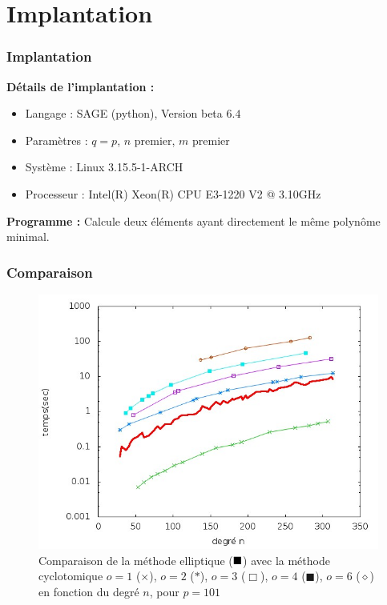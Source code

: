 \documentclass{beamer} %
\numberwithin{equation}{section}
\begin{document}
\section{Implantation}
\begin{frame}
\frametitle{Implantation}
\textbf{Détails de l'implantation :}\\
\begin{itemize}
\item Langage : SAGE (python), Version beta $6.4$
\item Paramètres : $q = p$, $n$ premier, $m$ premier
\item Système : Linux 3.15.5-1-ARCH 
\item Processeur : Intel(R) Xeon(R) CPU E3-1220 V2 @ 3.10GHz
\end{itemize}

\textbf{Programme :} Calcule deux éléments ayant directement le même polynôme
minimal.

\end{frame}
\begin{frame}
\frametitle{Comparaison}
\begin{figure}
\begin{center}
\includegraphics[scale=0.5]{testrc3}
\caption*{ Comparaison de la méthode elliptique
(\textcolor{elliptique}{$\small\blacksquare$}) avec la méthode cyclotomique 
$o = 1$ (\textcolor{o1}{$\times$}), $o = 2$ (\textcolor{o2}{$*$}), $o = 3$ 
(\textcolor{o3}{$\Box$}), $o = 4$ (\textcolor{o4}{$\blacksquare$}), $o = 6$ 
(\textcolor{o6}{$\diamond$}) en fonction du degré $n$, pour $p = 101$}
\end{center}
\end{figure}

\end{frame}
\end{document}
